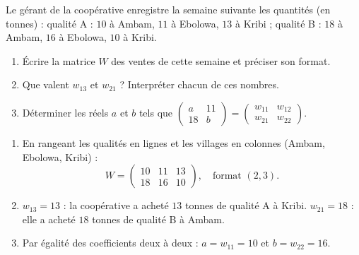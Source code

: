 \documentclass[11pt]{article}
\begin{document}
\begin{exercice}
Le gérant de la coopérative enregistre la semaine suivante les quantités (en tonnes) : qualité A : $10$ à Ambam, $11$ à Ebolowa, $13$ à Kribi ; qualité B : $18$ à Ambam, $16$ à Ebolowa, $10$ à Kribi.
\begin{enumerate}
\item Écrire la matrice $W$ des ventes de cette semaine et préciser son format.
\item Que valent $w_{13}$ et $w_{21}$ ? Interpréter chacun de ces nombres.
\item Déterminer les réels $a$ et $b$ tels que $\begin{pmatrix} a & 11 \\ 18 & b \end{pmatrix} = \begin{pmatrix} w_{11} & w_{12} \\ w_{21} & w_{22} \end{pmatrix}$.
\end{enumerate}
\end{exercice}

\begin{corrige}[Exercice 1]
\begin{enumerate}
\item En rangeant les qualités en lignes et les villages en colonnes (Ambam, Ebolowa, Kribi) :
\[
W = \begin{pmatrix} 10 & 11 & 13 \\ 18 & 16 & 10 \end{pmatrix}, \quad \text{format } (2,3).
\]
\item $w_{13} = 13$ : la coopérative a acheté $13$ tonnes de qualité A à Kribi. $w_{21} = 18$ : elle a acheté $18$ tonnes de qualité B à Ambam.
\item Par égalité des coefficients deux à deux : $a = w_{11} = 10$ et $b = w_{22} = 16$.
\end{enumerate}
\end{corrige}
\end{document}
